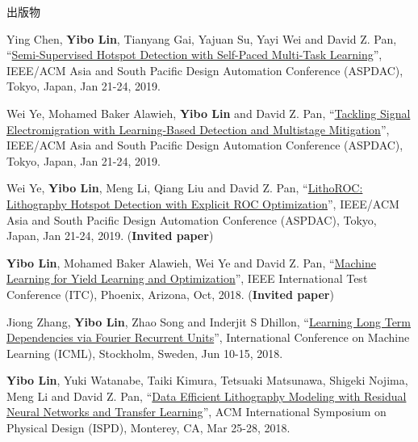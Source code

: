 \begin{rSection}{出版物}
\begin{description}[font=\normalfont, rightmargin=2em]
{}
            

\item[{[C21]}]{
        Ying Chen, \textbf{Yibo Lin}, Tianyang Gai, Yajuan Su, Yayi Wei and David Z. Pan, 
    ``\href{https://doi.org/10.1145/3287624.3287685}{Semi-Supervised Hotspot Detection with Self-Paced Multi-Task Learning}'', 
    IEEE/ACM Asia and South Pacific Design Automation Conference (ASPDAC), Tokyo, Japan, Jan 21-24, 2019.
    
}
            

\item[{[C20]}]{
        Wei Ye, Mohamed Baker Alawieh, \textbf{Yibo Lin} and David Z. Pan, 
    ``\href{https://doi.org/10.1145/3287624.3287688}{Tackling Signal Electromigration with Learning-Based Detection and Multistage Mitigation}'', 
    IEEE/ACM Asia and South Pacific Design Automation Conference (ASPDAC), Tokyo, Japan, Jan 21-24, 2019.
    
}
            

\item[{[C19]}]{
        Wei Ye, \textbf{Yibo Lin}, Meng Li, Qiang Liu and David Z. Pan, 
    ``\href{https://doi.org/10.1145/3287624.3288746}{LithoROC: Lithography Hotspot Detection with Explicit ROC Optimization}'', 
    IEEE/ACM Asia and South Pacific Design Automation Conference (ASPDAC), Tokyo, Japan, Jan 21-24, 2019.
    (\textbf{Invited paper})
}
            

\item[{[C18]}]{
        \textbf{Yibo Lin}, Mohamed Baker Alawieh, Wei Ye and David Z. Pan, 
    ``\href{https://doi.org/10.1109/TEST.2018.8624733}{Machine Learning for Yield Learning and Optimization}'', 
    IEEE International Test Conference (ITC), Phoenix, Arizona, Oct, 2018.
    (\textbf{Invited paper})
}
            

\item[{[C17]}]{
        Jiong Zhang, \textbf{Yibo Lin}, Zhao Song and Inderjit S Dhillon, 
    ``\href{https://arxiv.org/pdf/1803.06585.pdf}{Learning Long Term Dependencies via Fourier Recurrent Units}'', 
    International Conference on Machine Learning (ICML), Stockholm, Sweden, Jun 10-15, 2018.
    
}
            

\item[{[C16]}]{
        \textbf{Yibo Lin}, Yuki Watanabe, Taiki Kimura, Tetsuaki Matsunawa, Shigeki Nojima, Meng Li and David Z. Pan, 
    ``\href{https://doi.org/10.1145/3177540.3178242}{Data Efficient Lithography Modeling with Residual Neural Networks and Transfer Learning}'', 
    ACM International Symposium on Physical Design (ISPD), Monterey, CA, Mar 25-28, 2018.
    
}
\end{description}
\end{rSection}
